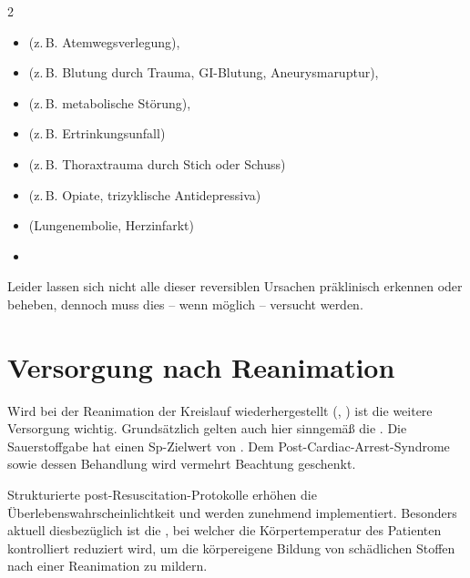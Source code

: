 \begin{multicols}{2}
\TableBaseModification
\begin{itemize}
  \item {}

  (z.\,B. Atemwegsverlegung),
  \item {}

  (z.\,B. Blutung durch Trauma,   GI-Blutung, Aneurysmaruptur),
  \item {}

  (z.\,B. metabolische Störung),
  \item {}

  (z.\,B. Ertrinkungsunfall)
  \item {}

  (z.\,B. Thoraxtrauma durch Stich oder Schuss)
  \item {}

  (z.\,B. Opiate, trizyklische Antidepressiva)
  \item {}

  (Lungenembolie, Herzinfarkt)
  \item {}
\end{itemize}
\end{multicols}


\noindent {} 

\bigskip

Leider lassen sich nicht alle dieser reversiblen Ursachen
präklinisch erkennen oder beheben, dennoch muss dies -- wenn
möglich -- versucht werden.


\section{Versorgung nach Reanimation}

Wird bei der Reanimation der Kreislauf wiederhergestellt
(, ) ist
die weitere Versorgung wichtig. Grundsätzlich gelten auch
hier sinngemäß die {\TxMassVit}. Die Sauerstoffgabe hat
einen Sp-Zielwert von \PC*.
Dem Post-Cardiac-Arrest-Syndrome sowie dessen Behandlung
wird vermehrt Beachtung geschenkt.

Strukturierte post-Resuscitation-Protokolle erhöhen die
Überlebenswahrscheinlichtkeit und werden zunehmend
implementiert. Besonders aktuell diesbezüglich ist die
, bei welcher die
Körpertemperatur des Patienten kontrolliert reduziert wird,
um die körpereigene Bildung von schädlichen Stoffen nach
einer Reanimation zu mildern.



